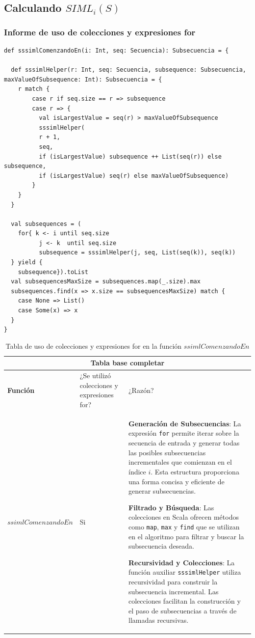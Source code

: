 \documentclass[12pt, a4paper]{article}
\begin{document}
\subsection{Calculando $SIML_i(S)$}
\subsubsection{Informe de uso de colecciones y expresiones for}
\begin{lstlisting}[caption=Código en Scala para la funcion sssimlComenzandoEn, label=lst:scala_code]
def sssimlComenzandoEn(i: Int, seq: Secuencia): Subsecuencia = {
      
  def sssimlHelper(r: Int, seq: Secuencia, subsequence: Subsecuencia, maxValueOfSubsequence: Int): Subsecuencia = {
    r match {
        case r if seq.size == r => subsequence
        case r => {
          val isLargestValue = seq(r) > maxValueOfSubsequence
          sssimlHelper(
          r + 1, 
          seq, 
          if (isLargestValue) subsequence ++ List(seq(r)) else subsequence, 
          if (isLargestValue) seq(r) else maxValueOfSubsequence)
        }
    }
  }

  val subsequences = (
    for{ k <- i until seq.size 
          j <- k  until seq.size
          subsequence = sssimlHelper(j, seq, List(seq(k)), seq(k))
  } yield {
    subsequence}).toList
  val subsequencesMaxSize = subsequences.map(_.size).max
  subsequences.find(x => x.size == subsequencesMaxSize) match {
    case None => List() 
    case Some(x) => x
  }
}
                        \end{lstlisting}
\begin{table}[H]
    \scriptsize
   \begin{tabular}{ |p{4cm}|p{3cm}|p{5.5cm}|  }
    \hline
    \multicolumn{3}{|c|}{Tabla base completar} \\
    \hline
    \textbf{Función}& ¿Se utilizó colecciones y expresiones for?  & ¿Razón?\\
    \hline
    $ssimlComenzandoEn$ & Si &  
    
       \textbf{Generación de Subsecuencias}: La expresión \texttt{for} permite iterar sobre la secuencia de entrada y generar todas las posibles subsecuencias incrementales que comienzan en el índice \(i\). Esta estructura proporciona una forma concisa y eficiente de generar subsecuencias.
      
      \textbf{Filtrado y Búsqueda}: Las colecciones en Scala ofrecen métodos como \texttt{map}, \texttt{max} y \texttt{find} que se utilizan en el algoritmo para filtrar y buscar la subsecuencia deseada.
      
       \textbf{Recursividad y Colecciones}: La función auxiliar \texttt{sssimlHelper} utiliza recursividad para construir la subsecuencia incremental. Las colecciones facilitan la construcción y el paso de subsecuencias a través de llamadas recursivas.
   \\
     \hline
   \end{tabular}
   \centering
   \caption{Tabla de uso de colecciones y expresiones for en la función $ssimlComenzandoEn$}
   \end{table}
\end{document}
